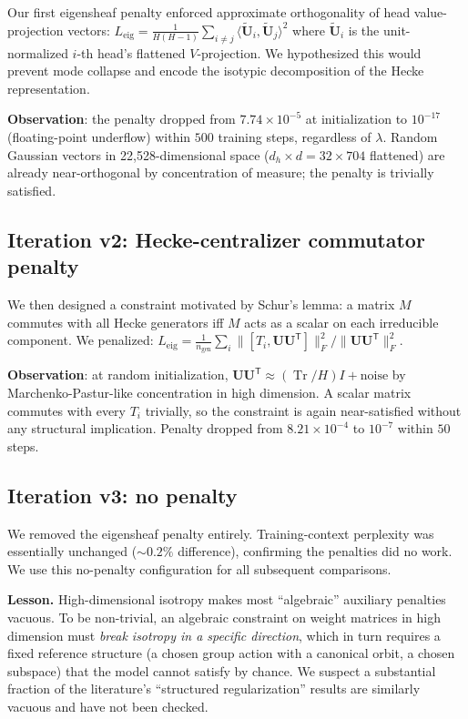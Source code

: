 \documentclass[11pt]{article}
\newcommand{\T}{\mathsf{T}}
\DeclareMathOperator{\Tr}{Tr}
\begin{document}
Our first eigensheaf penalty enforced approximate orthogonality of
head value-projection vectors:
$L_{\text{eig}} = \frac{1}{H(H{-}1)} \sum_{i \neq j} \langle \tilde{\bm{U}}_i, \tilde{\bm{U}}_j \rangle^2$
where $\tilde{\bm{U}}_i$ is the unit-normalized $i$-th head's flattened
$V$-projection. We hypothesized this would prevent mode collapse and
encode the isotypic decomposition of the Hecke representation.

\textbf{Observation}: the penalty dropped from $7.74 \times 10^{-5}$
at initialization to $10^{-17}$ (floating-point underflow) within
$500$ training steps, regardless of $\lambda$. Random Gaussian vectors
in 22{,}528-dimensional space ($d_h \times d = 32 \times 704$
flattened) are already near-orthogonal by concentration of measure;
the penalty is trivially satisfied.

\subsection{Iteration v2: Hecke-centralizer commutator penalty}

We then designed a constraint motivated by Schur's lemma: a matrix $M$
commutes with all Hecke generators iff $M$ acts as a scalar on each
irreducible component. We penalized:
$L_{\text{eig}} = \frac{1}{n_{\text{gen}}} \sum_i \|[T_i, \bm{U}\bm{U}^\T]\|_F^2 / \|\bm{U}\bm{U}^\T\|_F^2$.

\textbf{Observation}: at random initialization, $\bm{U}\bm{U}^\T \approx
(\Tr/H) I + \text{noise}$ by Marchenko-Pastur-like concentration in
high dimension. A scalar matrix commutes with every $T_i$ trivially,
so the constraint is again near-satisfied without any structural
implication. Penalty dropped from $8.21 \times 10^{-4}$ to
$10^{-7}$ within $50$ steps.

\subsection{Iteration v3: no penalty}

We removed the eigensheaf penalty entirely. Training-context
perplexity was essentially unchanged ($\sim 0.2\%$ difference),
confirming the penalties did no work. We use this no-penalty
configuration for all subsequent comparisons.

\textbf{Lesson.} High-dimensional isotropy makes most ``algebraic''
auxiliary penalties vacuous. To be non-trivial, an algebraic
constraint on weight matrices in high dimension must \emph{break
isotropy in a specific direction}, which in turn requires a fixed
reference structure (a chosen group action with a canonical orbit,
a chosen subspace) that the model cannot satisfy by chance. We
suspect a substantial fraction of the literature's ``structured
regularization'' results are similarly vacuous and have not been
checked.
\end{document}
